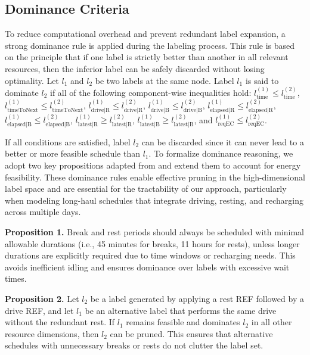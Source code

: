 \documentclass[trsc,dblanonrev]{informs4}
\begin{document}
\subsection{Dominance Criteria}\label{sec:DominanceCriteria}

To reduce computational overhead and prevent redundant label expansion, a strong dominance rule is applied during the labeling process. This rule is based on the principle that if one label is strictly better than another in all relevant resources, then the inferior label can be safely discarded without losing optimality. Let \( l_1 \) and \( l_2 \) be two labels at the same node. Label \( l_1 \) is said to dominate \( l_2 \) if all of the following component-wise inequalities hold: \( l_{\text{time}}^{(1)} \leq l_{\text{time}}^{(2)} \), \( l_{\text{timeToNext}}^{(1)} \leq l_{\text{timeToNext}}^{(2)} \), \( l_{\text{drive|R}}^{(1)} \leq l_{\text{drive|R}}^{(2)} \), \( l_{\text{drive|B}}^{(1)} \leq l_{\text{drive|B}}^{(2)} \), \( l_{\text{elapsed|R}}^{(1)} \leq l_{\text{elapsed|R}}^{(2)} \), \( l_{\text{elapsed|B}}^{(1)} \leq l_{\text{elapsed|B}}^{(2)} \), \( l_{\text{latest|R}}^{(1)} \geq l_{\text{latest|R}}^{(2)} \), \( l_{\text{latest|B}}^{(1)} \geq l_{\text{latest|B}}^{(2)} \), and \( l_{\text{reqEC}}^{(1)} \leq l_{\text{reqEC}}^{(2)} \).

If all conditions are satisfied, label \( l_2 \) can be discarded since it can never lead to a better or more feasible schedule than \( l_1 \). To formalize dominance reasoning, we adopt two key propositions adapted from \citet{goel2017exact} and extend them to account for energy feasibility. These dominance rules enable effective pruning in the high-dimensional label space and are essential for the tractability of our approach, particularly when modeling long-haul schedules that integrate driving, resting, and recharging across multiple days.

\textbf{Proposition 1.} Break and rest periods should always be scheduled with minimal allowable durations (i.e., 45 minutes for breaks, 11 hours for rests), unless longer durations are explicitly required due to time windows or recharging needs. This avoids inefficient idling and ensures dominance over labels with excessive wait times.

\textbf{Proposition 2.} Let \( l_2 \) be a label generated by applying a rest REF followed by a drive REF, and let \( l_1 \) be an alternative label that performs the same drive without the redundant rest. If \( l_1 \) remains feasible and dominates \( l_2 \) in all other resource dimensions, then \( l_2 \) can be pruned. This ensures that alternative schedules with unnecessary breaks or rests do not clutter the label set.
\end{document}
